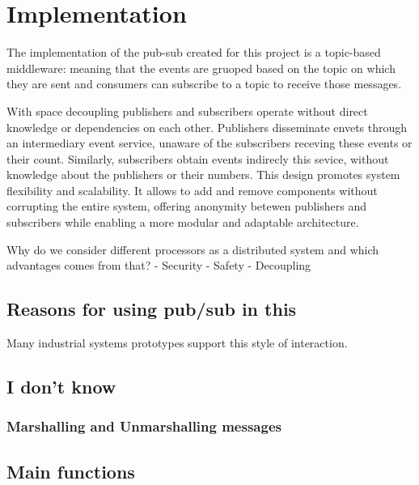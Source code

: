 

\chapter{Implementation}

The implementation of the pub-sub created for this project is a topic-based
middleware: meaning that the events are gruoped based on the topic on which
they are sent and consumers can subscribe to a topic to receive those messages.

With space decoupling publishers and subscribers operate without direct
knowledge or dependencies on each other. Publishers disseminate envets through
an intermediary event service, unaware of the subscribers receving these events
or their count. Similarly, subscribers obtain events indirecly this sevice,
without knowledge about the publishers or their numbers. This design promotes
system flexibility and scalability. It allows to add and remove components
without corrupting the entire system, offering anonymity betewen publishers
and subscribers while enabling a more modular and adaptable architecture.

Why do we consider different processors as a distributed system and which
advantages comes from that?
- Security
- Safety
- Decoupling

\section{Reasons for using pub/sub in this}

Many industrial systems prototypes support this style of interaction.

\section{I don't know}

\subsection{Marshalling and Unmarshalling messages}

\section{Main functions}

